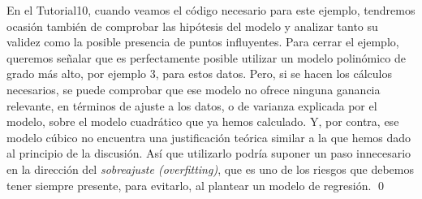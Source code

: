 \begin{ejemplo}
En el Tutorial10, cuando veamos el código necesario para este ejemplo, tendremos ocasión también de comprobar las hipótesis del modelo y analizar tanto su validez como la posible presencia de puntos influyentes. Para cerrar el ejemplo, queremos señalar que es perfectamente posible utilizar un modelo polinómico de grado más alto, por ejemplo $3$, para estos datos. Pero, si se hacen los cálculos necesarios, se puede comprobar que ese modelo no ofrece ninguna ganancia relevante, en términos de ajuste a los datos, o de varianza explicada por el modelo, sobre el modelo cuadrático que ya hemos calculado. Y, por contra, ese modelo cúbico no encuentra una justificación teórica similar a la que hemos dado al principio de la discusión. Así que utilizarlo podría suponer un paso innecesario en la dirección del {\em sobreajuste (overfitting)}, que es uno de los riesgos que debemos tener siempre presente, para evitarlo, al plantear un modelo de regresión.
\qed
\end{ejemplo}
